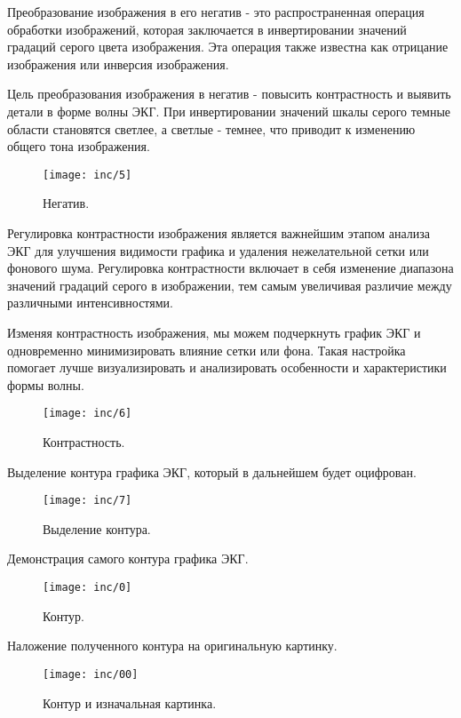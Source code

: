 Преобразование изображения в его негатив - это распространенная операция обработки изображений, которая заключается в инвертировании значений градаций серого цвета изображения. Эта операция также известна как отрицание изображения или инверсия изображения.

Цель преобразования изображения в негатив - повысить контрастность и выявить детали в форме волны ЭКГ. При инвертировании значений шкалы серого темные области становятся светлее, а светлые - темнее, что приводит к изменению общего тона изображения.

\begin{figure}
  \texttt{[image: inc/5]}
  \caption{Негатив.}
  \label{fig:fig5}
\end{figure}

Регулировка контрастности изображения является важнейшим этапом анализа ЭКГ для улучшения видимости графика и удаления нежелательной сетки или фонового шума. Регулировка контрастности включает в себя изменение диапазона значений градаций серого в изображении, тем самым увеличивая различие между различными интенсивностями.

Изменяя контрастность изображения, мы можем подчеркнуть график ЭКГ и одновременно минимизировать влияние сетки или фона. Такая настройка помогает лучше визуализировать и анализировать особенности и характеристики формы волны.

\begin{figure}
  \texttt{[image: inc/6]}
  \caption{Контрастность.}
  \label{fig:fig6}
\end{figure}

Выделение контура графика ЭКГ, который в дальнейшем будет оцифрован.

\begin{figure}
  \texttt{[image: inc/7]}
  \caption{Выделение контура.}
  \label{fig:fig7}
\end{figure}

Демонстрация самого контура графика ЭКГ.

\begin{figure}
  \texttt{[image: inc/0]}
  \caption{Контур.}
  \label{fig:fig8}
\end{figure}

Наложение полученного контура на оригинальную картинку. 

\begin{figure}
  \texttt{[image: inc/00]}
  \caption{Контур и изначальная картинка.}
  \label{fig:fig9}
\end{figure}

